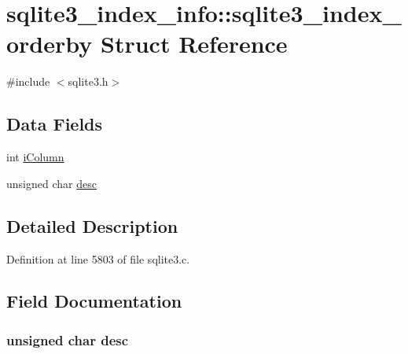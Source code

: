 \hypertarget{structsqlite3__index__info_1_1sqlite3__index__orderby}{}\section{sqlite3\+\_\+index\+\_\+info\+:\+:sqlite3\+\_\+index\+\_\+orderby Struct Reference}
\label{structsqlite3__index__info_1_1sqlite3__index__orderby}


{\ttfamily \#include $<$sqlite3.\+h$>$}

\subsection*{Data Fields}
\begin{DoxyCompactItemize}
\item 
int \hyperlink{structsqlite3__index__info_1_1sqlite3__index__orderby_a64afc1df38f1cd02b956e9dd963c0b97}{i\+Column}
\item 
unsigned char \hyperlink{structsqlite3__index__info_1_1sqlite3__index__orderby_abe5b6d2544ee9433489c61140bb1a77b}{desc}
\end{DoxyCompactItemize}


\subsection{Detailed Description}


Definition at line 5803 of file sqlite3.\+c.



\subsection{Field Documentation}
\hypertarget{structsqlite3__index__info_1_1sqlite3__index__orderby_abe5b6d2544ee9433489c61140bb1a77b}{}
\subsubsection[{desc}]{\setlength{\rightskip}{0pt plus 5cm}unsigned char desc}\label{structsqlite3__index__info_1_1sqlite3__index__orderby_abe5b6d2544ee9433489c61140bb1a77b}


